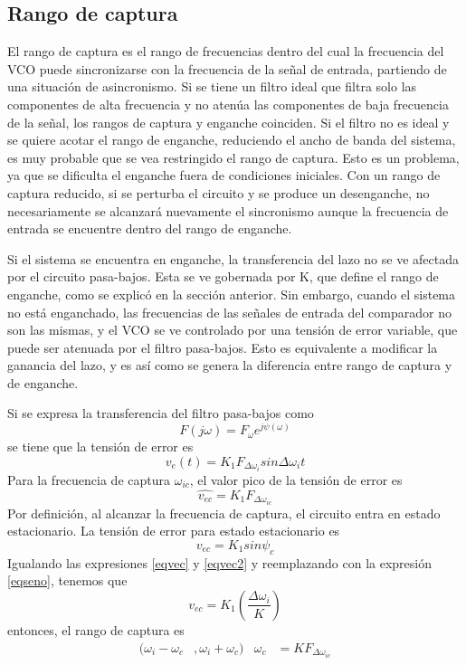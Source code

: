 \documentclass{article}
\begin{document}
\subsection{Rango de captura}
El rango de captura es el rango de frecuencias dentro del cual la frecuencia del VCO puede sincronizarse con la frecuencia de la señal de entrada, partiendo de una situación de asincronismo. Si se tiene un filtro ideal que filtra solo las componentes de alta frecuencia y no atenúa las componentes de baja frecuencia de la señal, los rangos de captura y enganche coinciden. Si el filtro no es ideal y se quiere acotar el rango de enganche, reduciendo el ancho de banda del sistema, es muy probable que se vea restringido el rango de captura. Esto es un problema, ya que se dificulta el enganche fuera de condiciones iniciales. Con un rango de captura reducido, si se perturba el circuito y se produce un desenganche, no necesariamente se alcanzará nuevamente el sincronismo aunque la frecuencia de entrada se encuentre dentro del rango de enganche.

Si el sistema se encuentra en enganche, la transferencia del lazo no se ve afectada por el circuito pasa-bajos. Esta se ve gobernada por K, que define el rango de enganche, como se explicó en la sección anterior. Sin embargo, cuando el sistema no está enganchado, las frecuencias de las señales de entrada del comparador no son las mismas, y el VCO se ve controlado por una tensión de error variable, que puede ser atenuada por el filtro pasa-bajos. Esto es equivalente a modificar la ganancia del lazo, y es así como se genera la diferencia entre rango de captura y de enganche.

Si se expresa la transferencia del filtro pasa-bajos como
\begin{equation}
    F(j\omega)=F_{\omega}e^{j\psi(\omega)}
\end{equation}
se tiene que la tensión de error es
\begin{equation}
    v_{e}(t)=K_{1}F_{\Delta\omega_{i}} sin \Delta\omega_{i}t
\end{equation}
Para la frecuencia de captura $\omega_{ic}$, el valor pico de la tensión de error es
\begin{equation}\label{eqvec}
    \hat{v_{ec}}=K_{1}F_{\Delta\omega_{ic}}
\end{equation}
Por definición, al alcanzar la frecuencia de captura, el circuito entra en estado estacionario. La tensión de error para estado estacionario es
\begin{equation}\label{eqvec2}
    v_{ec}=K_{1} sin\psi_{c}
\end{equation}
Igualando las expresiones \ref{eqvec} y \ref{eqvec2} y reemplazando con la expresión \ref{eqseno}, tenemos que
\begin{equation}
    v_{ec}=K_{1}(\frac{\Delta\omega_{i}}{K})
\end{equation}
entonces, el rango de captura es 
\begin{align}\label{rangocap}
    (\omega_{i}-\omega_{c} &, \omega_{i}+\omega_{c})   &   \omega_{c}&=KF_{\Delta\omega_{ic}}
\end{align}
\end{document}

